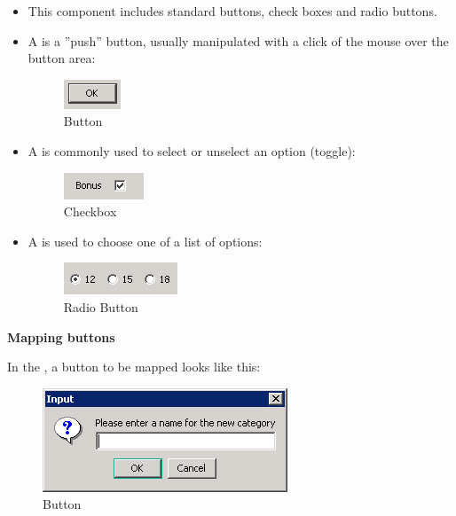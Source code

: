 \begin{itemize}
\item This component includes standard buttons, check boxes and radio buttons.
\item A  is a ''push'' button, 
usually manipulated with a click of the mouse over the button area:

\begin{figure}
\begin{center}
\includegraphics{PS/Button}
\caption{Button}
\label{button}
\end{center}
\end{figure}

\item A  is commonly used to select or unselect an option (toggle):

\begin{figure}
\begin{center}
\includegraphics{PS/Checkbox}
\caption{Checkbox}
\label{checkbox}
\end{center}
\end{figure}

\item A  is used to choose one of a list of options:

\begin{figure}
\begin{center}
\includegraphics{PS/Radiobutton}
\caption{Radio Button}
\label{radiobutton}
\end{center}
\end{figure}

\end{itemize}
\clearpage
\textbf{Mapping buttons}

In the \gdomm{}, a button to be mapped looks like this:

\begin{figure}
\begin{center}
\includegraphics{PS/Mapbutton}
\caption{Button}
\label{mapbutton}
\end{center}
\end{figure}
